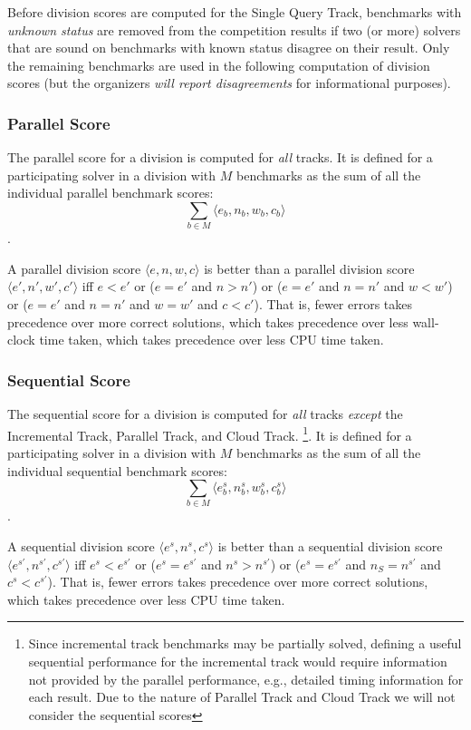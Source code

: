 \documentclass[12pt]{article}
\newcommand{\maintrack}{Single Query Track\xspace}
\newcommand{\inctrack}{Incremental Track\xspace}
\newcommand{\paralleltrack}{Parallel Track\xspace}
\newcommand{\cloudtrack}{Cloud Track\xspace}
\begin{document}
Before division scores are computed for the \maintrack{},
benchmarks with \emph{unknown status} are removed from the competition results
if two (or more) solvers that are sound on benchmarks with known status
disagree on their result.
%
Only the remaining benchmarks are used in the following computation of division
scores (but the organizers \emph{will report disagreements} for informational
purposes).

\subsubsection{Parallel Score}

The parallel score for a division is computed for \emph{all} tracks.  It is
defined for a participating solver in a division with $M$ benchmarks as the sum
of all the individual parallel benchmark scores:
$$\sum_{b\in M} \langle e_b , n_b , w_b, c_b\rangle$$.

\noindent
A parallel division score $\langle e, n, w, c\rangle$ is better than a parallel
division score $\langle e', n', w', c'\rangle$ iff $e < e'$ or ($e = e'$ and $n
> n'$) or ($e = e'$ and $n = n'$ and $w < w'$) or ($e = e'$ and $n = n'$ and $w
= w'$ and $c < c'$).  That is, fewer errors takes precedence over more correct
solutions, which takes precedence over less wall-clock time taken, which takes
precedence over less CPU time taken.

\subsubsection{Sequential Score}

The sequential score for a division is computed for \emph{all} tracks
\emph{except} the \inctrack, \paralleltrack, and \cloudtrack.
\footnote{Since incremental track benchmarks may be partially
solved, defining a useful sequential performance for the incremental track
would require information not provided by the parallel performance, e.g.,
detailed timing information for each result.  Due to the nature of
\paralleltrack and \cloudtrack we will not consider the sequential
scores}.  It is defined for a
participating solver in a division with $M$ benchmarks as the sum of all the
individual sequential benchmark scores:
$$\sum_{b\in M} \langle e_b^s, n_b^s, w_b^s, c_b^s\rangle$$.

\noindent
A sequential division score $\langle e^s, n^s, c^s\rangle$ is better than a
sequential division score $\langle e^{s'}, n^{s'}, c^{s'}\rangle$ iff
$e^s < e^{s'}$ or ($e^s = e^{s'}$ and $n^s > n^{s'}$) or ($e^s = e^{s'}$ and
$n_S = n^{s'}$ and $c^s < c^{s'}$).
That is, fewer errors takes precedence over more correct solutions,
which takes precedence over less CPU time taken.
\end{document}
